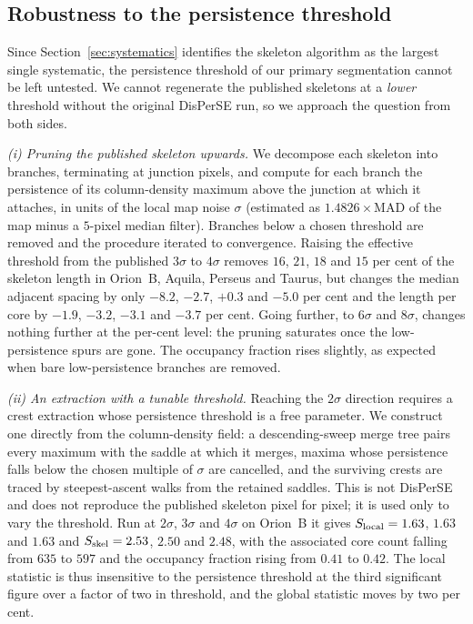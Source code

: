 \documentclass[usenatbib,twoside,twocolumn]{mnras}
\begin{document}
\subsection*{Robustness to the persistence threshold}
\label{sec:persistence}

Since Section~\ref{sec:systematics} identifies the skeleton algorithm as the largest single systematic, the persistence threshold of our primary segmentation cannot be left untested. We cannot regenerate the published skeletons at a \emph{lower} threshold without the original DisPerSE run, so we approach the question from both sides.

\smallskip\noindent\emph{(i) Pruning the published skeleton upwards.} We decompose each skeleton into branches, terminating at junction pixels, and compute for each branch the persistence of its column-density maximum above the junction at which it attaches, in units of the local map noise $\sigma$ (estimated as $1.4826\times$MAD of the map minus a $5$-pixel median filter). Branches below a chosen threshold are removed and the procedure iterated to convergence. Raising the effective threshold from the published $3\sigma$ to $4\sigma$ removes $16$, $21$, $18$ and $15$ per cent of the skeleton length in Orion~B, Aquila, Perseus and Taurus, but changes the median adjacent spacing by only $-8.2$, $-2.7$, $+0.3$ and $-5.0$ per cent and the length per core by $-1.9$, $-3.2$, $-3.1$ and $-3.7$ per cent. Going further, to $6\sigma$ and $8\sigma$, changes nothing further at the per-cent level: the pruning saturates once the low-persistence spurs are gone. The occupancy fraction rises slightly, as expected when bare low-persistence branches are removed.

\smallskip\noindent\emph{(ii) An extraction with a tunable threshold.} Reaching the $2\sigma$ direction requires a crest extraction whose persistence threshold is a free parameter. We construct one directly from the column-density field: a descending-sweep merge tree pairs every maximum with the saddle at which it merges, maxima whose persistence falls below the chosen multiple of $\sigma$ are cancelled, and the surviving crests are traced by steepest-ascent walks from the retained saddles. This is not DisPerSE and does not reproduce the published skeleton pixel for pixel; it is used only to vary the threshold. Run at $2\sigma$, $3\sigma$ and $4\sigma$ on Orion~B it gives $S_{\rm local}=1.63$, $1.63$ and $1.63$ and $S_{\rm skel}=2.53$, $2.50$ and $2.48$, with the associated core count falling from $635$ to $597$ and the occupancy fraction rising from $0.41$ to $0.42$. The local statistic is thus insensitive to the persistence threshold at the third significant figure over a factor of two in threshold, and the global statistic moves by two per cent.
\end{document}
